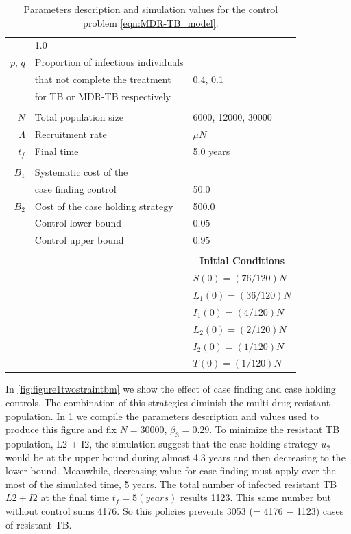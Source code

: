 \begin{table}
\begin{tabular}{rll}
			& \num{1.0}
     	    \\
     	    $p$, $q$
     	    & Proportion of infectious individuals 
     	    \\
     	    & that not complete the treatment  
     	    & \num{0.4}, \num{0.1}
     	    \\
     	    & for TB or MDR-TB respectively
		\\
		\\	
			$N$ 
			& Total population size
			& 
			\num{6000}, 
			\num{12000}, 
			\num{30000}
            \\
			$\Lambda$ 
				& Recruitment rate
				& $\mu N$
            \\
            $t_f$ 
            & Final time 
            & \num{5.0} years
      \\
      \\
     	    $B_1$ 
     	    & Systematic cost of the 
     	    \\
     	    & case finding  control
     	    & \num{50.0}
			\\
     	    $B_2$
     	    & 
     	    Cost of the case holding strategy
     	    & \num{500.0}
     	    \\
     	    & Control lower bound  & $0.05$
			\\
          & Control upper bound & $0.95$
       		\\
       		\\
		&&\multicolumn{1}{c}{\textbf{Initial Conditions}}
		\\
		\cmidrule{3-3}
		&&	
		$S(0) = (76/120)N$
		\\
		&&
		$L_1(0) = (36/120) N$
		\\
		&&
		$I_1(0) = (4/120)N$
		\\
		&&
		$L_2(0) =(2/120) N$
		\\
		&&
		$I_2(0) = (1/120)N$
		\\
		&&
		$T(0)= (1/120)N$
		\\
		\bottomrule
    \end{tabular}
	\caption{Parameters description and simulation values for the control 
	problem \eqref{eqn:MDR-TB_model}.}
	\label{tbl:parameters_MDR-TB_model}
\end{table}


	In \cref{fig:figure1twostraintbm} we show the effect of case finding and 
case holding controls. The combination of this strategies diminish the multi 
drug resistant population. In \cref{tbl:parameters_MDR-TB_model} we compile the 
parameters description and values used to produce this figure and fix 
$N = \num{30000}$, $\beta_3 = \num{0.29}$. To minimize the resistant TB 
population, L2 + I2, the simulation suggest that the case holding strategy 
$u_2$ would be at the upper bound during almost \num{4.3} years and then 
decreasing to the lower bound. Meanwhile, decreasing value for case finding
must apply over the most of the simulated time, 5 years. The total number of 
infected resistant TB $L2 + I2$  at the final time $t_f = 5(years)$ results
\num{1123}. This same number but without control sums 4176. So this policies 
prevents  \num{3053} (= 4176 − 1123) cases of resistant TB.


